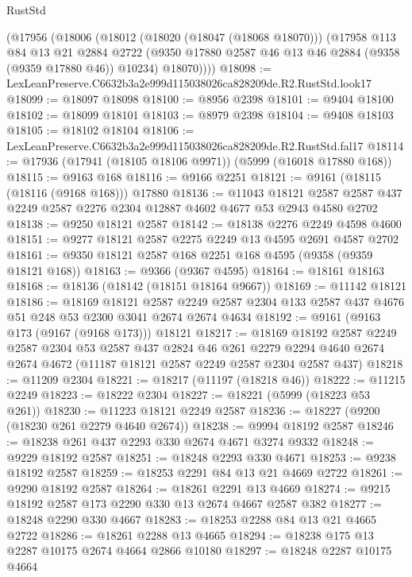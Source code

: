 \begin{lexlean}{RustStd}
\begin{coremodule}
    (@17956
      (@18006
        (@18012
          (@18020 (@18047 (@18068 @18070)))
          (@17958
            @113
            @84
            @13
            @21
            @2884
            @2722
            (@9350 @17880 @2587 @46 @13 @46 @2884 (@9358 (@9359 @17880 @46)) @10234)
            @18070))))
@18098 := LexLeanPreserve.C6632b3a2e999d115038026ca828209de.R2.RustStd.look17
@18099 := @18097 @18098
@18100 := @8956 @2398
@18101 := @9404 @18100
@18102 := @18099 @18101
@18103 := @8979 @2398
@18104 := @9408 @18103
@18105 := @18102 @18104
@18106 := LexLeanPreserve.C6632b3a2e999d115038026ca828209de.R2.RustStd.fal17
@18114 := @17936 (@17941 (@18105 @18106 @9971)) (@5999 (@16018 @17880 @168))
@18115 := @9163 @168
@18116 := @9166 @2251
@18121 := @9161 (@18115 (@18116 (@9168 @168))) @17880
@18136 := @11043
    @18121
    @2587
    @2587
    @437
    @2249
    @2587
    @2276
    @2304
    @12887
    @4602
    @4677
    @53
    @2943
    @4580
    @2702
@18138 := @9250 @18121 @2587
@18142 := @18138 @2276 @2249 @4598 @4600
@18151 := @9277 @18121 @2587 @2275 @2249 @13 @4595 @2691 @4587 @2702
@18161 := @9350 @18121 @2587 @168 @2251 @168 @4595 (@9358 (@9359 @18121 @168))
@18163 := @9366 (@9367 @4595)
@18164 := @18161 @18163
@18168 := @18136 (@18142 (@18151 @18164 @9667))
@18169 := @11142 @18121
@18186 := @18169
    @18121
    @2587
    @2249
    @2587
    @2304
    @133
    @2587
    @437
    @4676
    @51
    @248
    @53
    @2300
    @3041
    @2674
    @2674
    @4634
@18192 := @9161 (@9163 @173 (@9167 (@9168 @173))) @18121
@18217 := @18169
    @18192
    @2587
    @2249
    @2587
    @2304
    @53
    @2587
    @437
    @2824
    @46
    @261
    @2279
    @2294
    @4640
    @2674
    @2674
    @4672
    (@11187 @18121 @2587 @2249 @2587 @2304 @2587 @437)
@18218 := @11209 @2304
@18221 := @18217 (@11197 (@18218 @46))
@18222 := @11215 @2249
@18223 := @18222 @2304
@18227 := @18221 (@5999 (@18223 @53 @261))
@18230 := @11223 @18121 @2249 @2587
@18236 := @18227 (@9200 (@18230 @261 @2279 @4640 @2674))
@18238 := @9994 @18192 @2587
@18246 := @18238 @261 @437 @2293 @330 @2674 @4671 @3274 @9332
@18248 := @9229 @18192 @2587
@18251 := @18248 @2293 @330 @4671
@18253 := @9238 @18192 @2587
@18259 := @18253 @2291 @84 @13 @21 @4669 @2722
@18261 := @9290 @18192 @2587
@18264 := @18261 @2291 @13 @4669
@18274 := @9215 @18192 @2587 @173 @2290 @330 @13 @2674 @4667 @2587 @382
@18277 := @18248 @2290 @330 @4667
@18283 := @18253 @2288 @84 @13 @21 @4665 @2722
@18286 := @18261 @2288 @13 @4665
@18294 := @18238 @175 @13 @2287 @10175 @2674 @4664 @2866 @10180
@18297 := @18248 @2287 @10175 @4664

\end{coremodule}
\end{lexlean}
